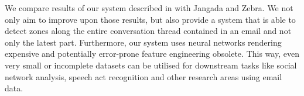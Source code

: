 \documentclass{llncs}
\begin{document}
We compare results of our system described in  with Jangada and Zebra.
We not only aim to improve upon those results, but also provide a system that is able to detect zones along the entire conversation thread contained in an email and not only the latest part.
Furthermore, our system uses neural networks rendering expensive and potentially error-prone feature engineering obsolete.
This way, even very small or incomplete datasets can be utilised for downstream tasks like social network analysis, speech act recognition and other research areas using email data.










\end{document}
